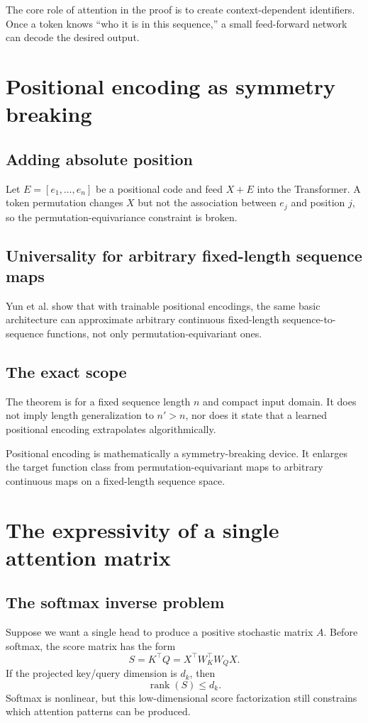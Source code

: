 \documentclass[11pt,a4paper,oneside,openany]{memoir}
\DeclareMathOperator{\rank}{rank}
\theoremstyle{definition}
\begin{document}
\begin{presentbox}
The core role of attention in the proof is to create context-dependent identifiers.  Once a token knows ``who it is in this sequence,'' a small feed-forward network can decode the desired output.
\end{presentbox}

\chapter{Positional encoding as symmetry breaking}
\section{Adding absolute position}
Let $E=[e_1,\ldots,e_n]$ be a positional code and feed $X+E$ into the Transformer.  A token permutation changes $X$ but not the association between $e_j$ and position $j$, so the permutation-equivariance constraint is broken.

\section{Universality for arbitrary fixed-length sequence maps}
Yun et al. show that with trainable positional encodings, the same basic architecture can approximate arbitrary continuous fixed-length sequence-to-sequence functions, not only permutation-equivariant ones.

\section{The exact scope}
The theorem is for a fixed sequence length $n$ and compact input domain.  It does not imply length generalization to $n'>n$, nor does it state that a learned positional encoding extrapolates algorithmically.

\begin{presentbox}
Positional encoding is mathematically a symmetry-breaking device.  It enlarges the target function class from permutation-equivariant maps to arbitrary continuous maps on a fixed-length sequence space.
\end{presentbox}

\chapter{The expressivity of a single attention matrix}
\section{The softmax inverse problem}
Suppose we want a single head to produce a positive stochastic matrix $A$.  Before softmax, the score matrix has the form
\[
S=K^\top Q=X^\top W_K^\top W_QX.
\]
If the projected key/query dimension is $d_k$, then
\[
\rank(S)\le d_k.
\]
Softmax is nonlinear, but this low-dimensional score factorization still constrains which attention patterns can be produced.
\end{document}
